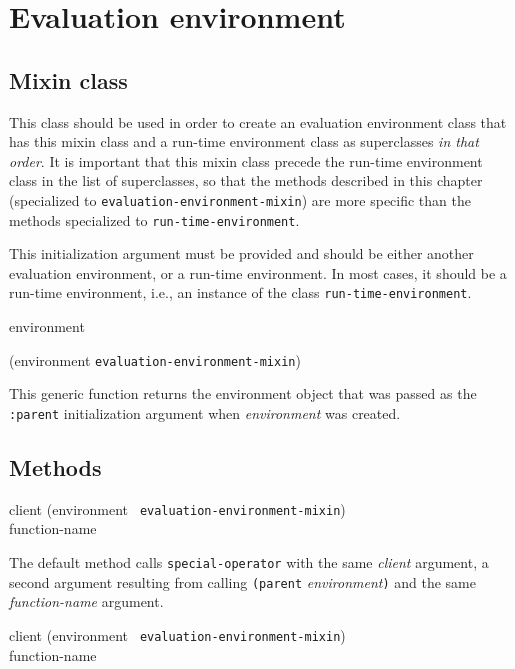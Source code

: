 \chapter{Evaluation environment}

\section{Mixin class}


This class should be used in order to create an evaluation environment
class that has this mixin class and a run-time environment class as
superclasses \emph{in that order}.  It is important that this mixin
class precede the run-time environment class in the list of
superclasses, so that the methods described in this chapter
(specialized to \texttt{evaluation-environment-mixin}) are more
specific than the methods specialized to
\texttt{run-time-environment}.


This initialization argument must be provided and should be either
another evaluation environment, or a run-time environment.  In most
cases, it should be a run-time environment, i.e., an instance of the
class \texttt{run-time-environment}.

 {environment}

 {(environment {\tt evaluation-environment-mixin})}

This generic function returns the environment object that was passed
as the \texttt{:parent} initialization argument when
\textit{environment} was created.

\section{Methods}

{\small{} {client (environment {\tt
      evaluation-environment-mixin}) \\ function-name}
}

The default method calls \texttt{special-operator} with the same
\textit{client} argument, a second argument resulting from calling
\texttt{(parent} \textit{environment}\texttt{)} and the same
\textit{function-name} argument.

{\small{} {client (environment {\tt
      evaluation-environment-mixin}) \\ function-name}
}

